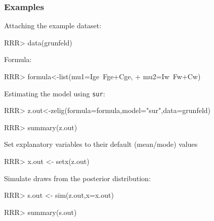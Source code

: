 \subsubsection{Examples}
 Attaching the example dataset:
\begin{Schunk}
\begin{Sinput}
RRR>   data(grunfeld)
\end{Sinput}
\end{Schunk}
 Formula:
\begin{Schunk}
\begin{Sinput}
RRR>  formula<-list(mu1=Ige~Fge+Cge,
+               mu2=Iw~Fw+Cw)
\end{Sinput}
\end{Schunk}
Estimating the model using \texttt{sur}:
\begin{Schunk}
\begin{Sinput}
RRR>  z.out<-zelig(formula=formula,model="sur",data=grunfeld)
\end{Sinput}
\end{Schunk}
\begin{Schunk}
\begin{Sinput}
RRR> summary(z.out)
\end{Sinput}
\end{Schunk}

Set explanatory variables to their default (mean/mode) values
\begin{Schunk}
\begin{Sinput}
RRR>  x.out <- setx(z.out)
\end{Sinput}
\end{Schunk}

Simulate draws from the posterior distribution:
\begin{Schunk}
\begin{Sinput}
RRR>  s.out <- sim(z.out,x=x.out)
\end{Sinput}
\end{Schunk}
\begin{Schunk}
\begin{Sinput}
RRR> summary(s.out)
\end{Sinput}
\end{Schunk}
\clearpage
